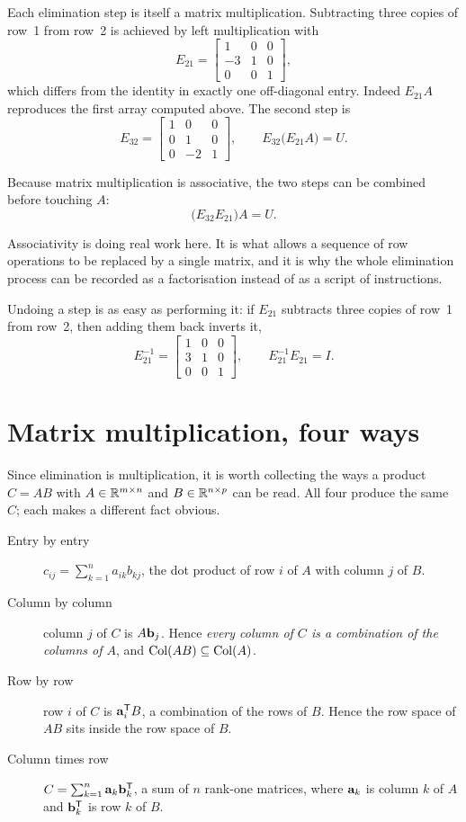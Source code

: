 Each elimination step is itself a matrix multiplication. Subtracting three
copies of row~1 from row~2 is achieved by left multiplication with
\[
	E_{21}=\begin{bmatrix}1&0&0\\-3&1&0\\0&0&1\end{bmatrix},
\]
which differs from the identity in exactly one off-diagonal entry. Indeed
\(E_{21}A\) reproduces the first array computed above. The second step is
\[
	E_{32}=\begin{bmatrix}1&0&0\\0&1&0\\0&-2&1\end{bmatrix},
	\qquad
	E_{32}\bigl(E_{21}A\bigr)=U .
\]

Because matrix multiplication is associative, the two steps can be combined
before touching \(A\):
\[
	\bigl(E_{32}E_{21}\bigr)A=U .
\]

\begin{remark}
Associativity is doing real work here. It is what allows a sequence of row
operations to be replaced by a single matrix, and it is why the whole
elimination process can be recorded as a factorisation instead of as a script of
instructions.
\end{remark}

Undoing a step is as easy as performing it: if \(E_{21}\) subtracts three copies
of row~1 from row~2, then adding them back inverts it,
\[
	E_{21}^{-1}=\begin{bmatrix}1&0&0\\3&1&0\\0&0&1\end{bmatrix},
	\qquad
	E_{21}^{-1}E_{21}=I .
\]

\section{Matrix multiplication, four ways}

Since elimination is multiplication, it is worth collecting the ways a product
\(C=AB\) with \(A\in\mathbb{R}^{m\times n}\) and \(B\in\mathbb{R}^{n\times p}\) can be read. All
four produce the same \(C\); each makes a different fact obvious.

\begin{description}
	\item[Entry by entry] \(c_{ij}=\sum_{k=1}^{n}a_{ik}b_{kj}\), the dot product
	of row \(i\) of \(A\) with column \(j\) of \(B\).
	\item[Column by column] column \(j\) of \(C\) is \(A\mathbf{b}_j\). Hence
	\emph{every column of \(C\) is a combination of the columns of \(A\)}, and
	\(\operatorname{Col}(AB)\subseteq\operatorname{Col}(A)\).
	\item[Row by row] row \(i\) of \(C\) is \(\mathbf{a}_i^{\mathsf{T}} B\), a combination of
	the rows of \(B\). Hence the row space of \(AB\) sits inside the row space of
	\(B\).
	\item[Column times row] \(C=\sum_{k=1}^{n}\mathbf{a}_k\mathbf{b}_k^{\mathsf{T}}\), a sum of
	\(n\) rank-one matrices, where \(\mathbf{a}_k\) is column \(k\) of \(A\) and
	\(\mathbf{b}_k^{\mathsf{T}}\) is row \(k\) of \(B\).
\end{description}

